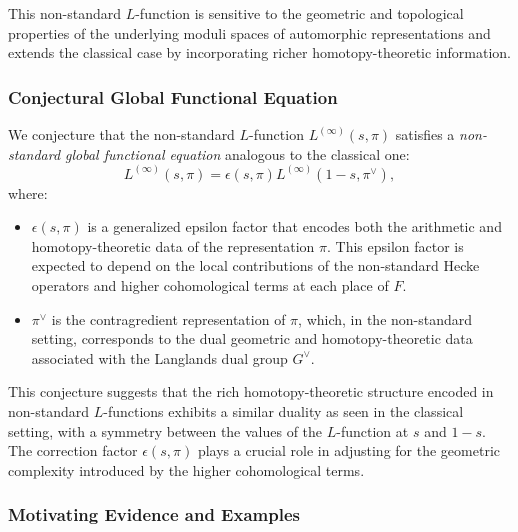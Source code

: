 \documentclass{article}
\theoremstyle{remark}
\begin{document}
This non-standard $L$-function is sensitive to the geometric and topological properties of the underlying moduli spaces of automorphic representations and extends the classical case by incorporating richer homotopy-theoretic information.

\subsubsection{Conjectural Global Functional Equation}

We conjecture that the non-standard $L$-function $L^{(\infty)}(s, \pi)$ satisfies a \emph{non-standard global functional equation} analogous to the classical one:
\[
L^{(\infty)}(s, \pi) = \epsilon(s, \pi) L^{(\infty)}(1 - s, \pi^\vee),
\]
where:
\begin{itemize}
    \item $\epsilon(s, \pi)$ is a generalized epsilon factor that encodes both the arithmetic and homotopy-theoretic data of the representation $\pi$. This epsilon factor is expected to depend on the local contributions of the non-standard Hecke operators and higher cohomological terms at each place of $F$.
    \item $\pi^\vee$ is the contragredient representation of $\pi$, which, in the non-standard setting, corresponds to the dual geometric and homotopy-theoretic data associated with the Langlands dual group $G^\vee$.
\end{itemize}

This conjecture suggests that the rich homotopy-theoretic structure encoded in non-standard $L$-functions exhibits a similar duality as seen in the classical setting, with a symmetry between the values of the $L$-function at $s$ and $1 - s$. The correction factor $\epsilon(s, \pi)$ plays a crucial role in adjusting for the geometric complexity introduced by the higher cohomological terms.

\subsubsection{Motivating Evidence and Examples}
\end{document}
